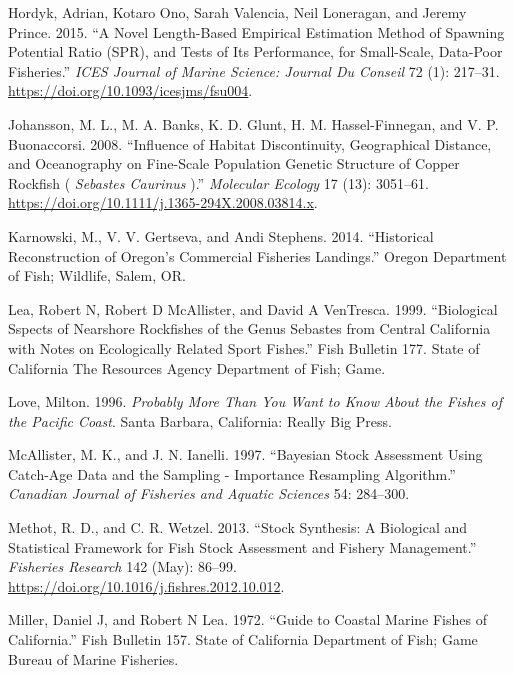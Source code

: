 \documentclass[11pt,
  english,
  a4paper,
]{article}
\begin{document}
\begin{cslreferences}
\leavevmode\hypertarget{ref-hordyk_novel_2015}{}%
Hordyk, Adrian, Kotaro Ono, Sarah Valencia, Neil Loneragan, and Jeremy Prince. 2015. ``A Novel Length-Based Empirical Estimation Method of Spawning Potential Ratio (SPR), and Tests of Its Performance, for Small-Scale, Data-Poor Fisheries.'' \emph{ICES Journal of Marine Science: Journal Du Conseil} 72 (1): 217--31. \url{https://doi.org/10.1093/icesjms/fsu004}.

\leavevmode\hypertarget{ref-johansson_influence_2008}{}%
Johansson, M. L., M. A. Banks, K. D. Glunt, H. M. Hassel-Finnegan, and V. P. Buonaccorsi. 2008. ``Influence of Habitat Discontinuity, Geographical Distance, and Oceanography on Fine-Scale Population Genetic Structure of Copper Rockfish ( \emph{Sebastes Caurinus} ).'' \emph{Molecular Ecology} 17 (13): 3051--61. \url{https://doi.org/10.1111/j.1365-294X.2008.03814.x}.

\leavevmode\hypertarget{ref-karnowski_historical_2014}{}%
Karnowski, M., V. V. Gertseva, and Andi Stephens. 2014. ``Historical Reconstruction of Oregon's Commercial Fisheries Landings.'' Oregon Department of Fish; Wildlife, Salem, OR.

\leavevmode\hypertarget{ref-lea_biological_1999}{}%
Lea, Robert N, Robert D McAllister, and David A VenTresca. 1999. ``Biological Sspects of Nearshore Rockfishes of the Genus Sebastes from Central California with Notes on Ecologically Related Sport Fishes.'' Fish Bulletin 177. State of California The Resources Agency Department of Fish; Game.

\leavevmode\hypertarget{ref-love_milton_probably_1996}{}%
Love, Milton. 1996. \emph{Probably More Than You Want to Know About the Fishes of the Pacific Coast}. Santa Barbara, California: Really Big Press.

\leavevmode\hypertarget{ref-mcallister_bayesian_1997}{}%
McAllister, M. K., and J. N. Ianelli. 1997. ``Bayesian Stock Assessment Using Catch-Age Data and the Sampling - Importance Resampling Algorithm.'' \emph{Canadian Journal of Fisheries and Aquatic Sciences} 54: 284--300.

\leavevmode\hypertarget{ref-methot_stock_2013}{}%
Methot, R. D., and C. R. Wetzel. 2013. ``Stock Synthesis: A Biological and Statistical Framework for Fish Stock Assessment and Fishery Management.'' \emph{Fisheries Research} 142 (May): 86--99. \url{https://doi.org/10.1016/j.fishres.2012.10.012}.

\leavevmode\hypertarget{ref-miller_guide_1972}{}%
Miller, Daniel J, and Robert N Lea. 1972. ``Guide to Coastal Marine Fishes of California.'' Fish Bulletin 157. State of California Department of Fish; Game Bureau of Marine Fisheries.


\end{cslreferences}
\end{document}
